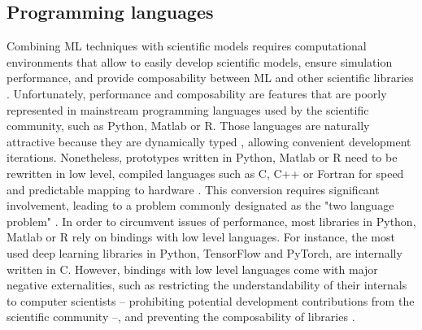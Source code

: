 


\subsection{Programming languages}

Combining ML techniques with scientific models requires computational environments that allow to easily develop scientific models, ensure simulation performance, and provide composability between ML and other scientific libraries \citep{Rackauckas2020}. Unfortunately, performance and composability are features that are poorly represented in mainstream programming languages used by the scientific community, such as Python, Matlab or R.
% 
Those languages are naturally attractive because they are dynamically typed \citep{XX}, allowing convenient development iterations. Nonetheless, prototypes written in Python, Matlab or R need to be rewritten in low level, compiled languages such as C, C++ or Fortran for speed and predictable mapping to hardware \citep{Perkel2019,Bezanson2017}. This conversion requires significant involvement, leading to a problem commonly designated as the "two language problem" \citep{Bezanson2017}.
% 
In order to circumvent issues of performance, most libraries in Python, Matlab or R rely on bindings with low level languages. For instance, the most used deep learning libraries in Python, TensorFlow and PyTorch, are internally written in C. However, bindings with low level languages come with major negative externalities, such as restricting the understandability of their internals to computer scientists -- prohibiting potential development contributions from the scientific community --, and preventing the composability of libraries \citep{XXX}. 

